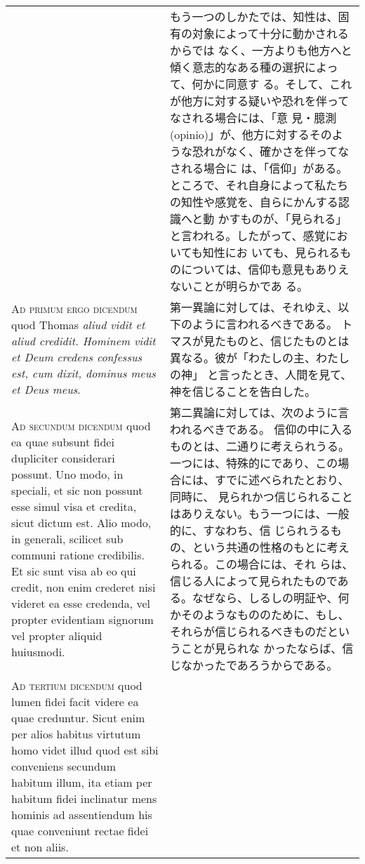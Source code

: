 \documentclass[10pt]{jsarticle} %
\begin{document}
\begin{longtable}{p{21em}p{21em}}
&

もう一つのしかたでは、知性は、固有の対象によって十分に動かされるからでは
 なく、一方よりも他方へと傾く意志的なある種の選択によって、何かに同意す
 る。そして、これが他方に対する疑いや恐れを伴ってなされる場合には、「意
 見・臆測(opinio)」が、他方に対するそのような恐れがなく、確かさを伴ってなされる場合に
 は、「信仰」がある。
ところで、それ自身によって私たちの知性や感覚を、自らにかんする認識へと動
 かすものが、「見られる」と言われる。したがって、感覚においても知性にお
 いても、見られるものについては、信仰も意見もありえないことが明らかであ
 る。


\\


{\scshape Ad primum ergo dicendum} quod Thomas {\itshape aliud vidit et aliud
credidit. Hominem vidit et Deum credens confessus est, cum dixit,
dominus meus et Deus meus}.

&

第一異論に対しては、それゆえ、以下のように言われるべきである。
トマスが見たものと、信じたものとは異なる。彼が「わたしの主、わたしの神」
 と言ったとき、人間を見て、神を信じることを告白した。

\\


{\scshape Ad secundum dicendum} quod ea quae subsunt fidei dupliciter
considerari possunt. Uno modo, in speciali, et sic non possunt esse
simul visa et credita, sicut dictum est. Alio modo, in generali,
scilicet sub communi ratione credibilis. Et sic sunt visa ab eo qui
credit, non enim crederet nisi videret ea esse credenda, vel propter
evidentiam signorum vel propter aliquid huiusmodi.

&

第二異論に対しては、次のように言われるべきである。
信仰の中に入るものとは、二通りに考えられうる。
一つには、特殊的にであり、この場合には、すでに述べられたとおり、同時に、
 見られかつ信じられることはありえない。もう一つには、一般的に、すなわち、信
 じられうるもの、という共通の性格のもとに考えられる。この場合には、それ
 らは、信じる人によって見られたものである。なぜなら、しるしの明証や、何かそのようなもののために、もし、それらが信じられるべきものだということが見られな
 かったならば、信じなかったであろうからである。


\\


{\scshape Ad tertium dicendum} quod lumen fidei facit videre ea quae
creduntur. Sicut enim per alios habitus virtutum homo videt illud quod
est sibi conveniens secundum habitum illum, ita etiam per habitum fidei
inclinatur mens hominis ad assentiendum his quae conveniunt rectae fidei
et non aliis.


\end{longtable}
\end{document}
